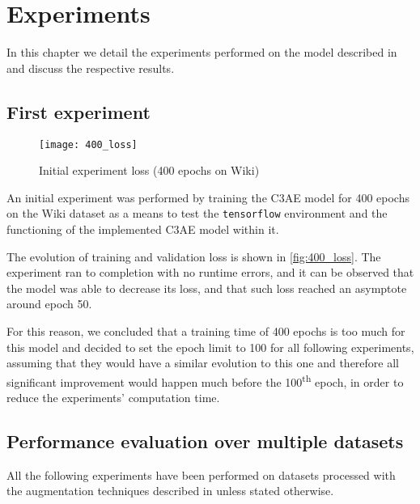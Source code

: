 
\chapter{Experiments}
\label{chp:experiments}
In this chapter we detail the experiments performed on the model described in
 and discuss the respective results.

\section{First experiment}
\label{subsec:first}

\begin{wrapfigure}[15]{r}{0.5\textwidth}
    \centering
    \vspace{-20pt}
    \texttt{[image: 400\_loss]}
    \caption{Initial experiment loss (400 epochs on Wiki)}
    \label{fig:400_loss}
\end{wrapfigure}

An initial experiment was performed by training the C3AE model for
400 epochs on the Wiki dataset as a means to test the \texttt{tensorflow} environment
and the functioning of the implemented C3AE model within it.

The evolution of training and validation loss is shown in \autoref{fig:400_loss}.
The experiment ran to completion with no runtime errors, and
it can be observed that the model was able to decrease its loss,
and that such loss reached an asymptote around epoch 50.

For this reason, we concluded that a training time of 400 epochs
is too much for this model and decided to set the epoch limit to 100 for
all following experiments, assuming that they would have a similar
evolution to this one and therefore all significant improvement
would happen much before the 100\textsuperscript{th} epoch,
in order to reduce the experiments' computation time.

\section{Performance evaluation over multiple datasets}

All the following experiments have been performed on datasets processed with the 
augmentation techniques described in  unless stated otherwise.

